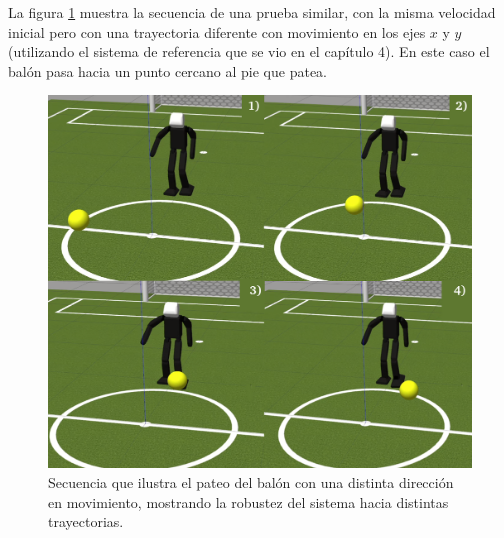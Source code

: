 	La figura \ref{fig:final_test} muestra la secuencia de una prueba similar, con la misma velocidad inicial pero con una trayectoria diferente con movimiento en los ejes $x$ y $y$ (utilizando el sistema de referencia que se vio en el capítulo 4). En este caso el balón pasa hacia un punto cercano al pie que patea.
	
	
\begin{figure}
\centering
	\includegraphics[scale=0.45]{images/final_test.png}
	\caption{Secuencia que ilustra el pateo del balón con una distinta dirección en movimiento, mostrando la robustez del sistema hacia distintas trayectorias.}
\label{fig:final_test}
\end{figure} 